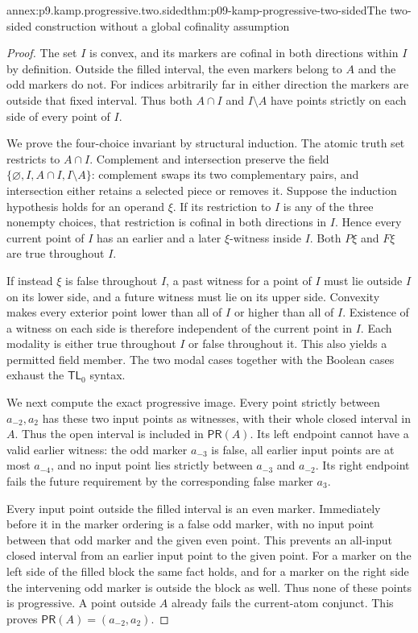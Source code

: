\begin{annexitem}{annex:p9.kamp.progressive.two.sided}{thm:p09-kamp-progressive-two-sided}{The two-sided construction without a global cofinality assumption}
\begin{proof}
The set \(I\) is convex, and its markers are cofinal
in both directions within \(I\) by definition. Outside
the filled interval, the even markers belong to \(A\)
and the odd markers do not. For indices arbitrarily
far in either direction the markers are outside that
fixed interval. Thus both \(A\cap I\) and
\(I\setminus A\) have points strictly on each side
of every point of \(I\).

We prove the four-choice invariant by structural
induction. The atomic truth set restricts to
\(A\cap I\). Complement and intersection preserve
the field \(\{\varnothing,I,A\cap I,I\setminus A\}\):
complement swaps its two complementary pairs, and
intersection either retains a selected piece or removes
it. Suppose the induction hypothesis holds for an
operand \(\xi\). If its restriction to \(I\)
is any of the three nonempty choices, that restriction
is cofinal in both directions in \(I\). Hence every
current point of \(I\) has an earlier and a later
\(\xi\)-witness inside \(I\). Both \(P\xi\)
and \(F\xi\) are true throughout \(I\).

If instead \(\xi\) is false throughout \(I\),
a past witness for a point of \(I\) must lie
outside \(I\) on its lower side, and a future
witness must lie on its upper side. Convexity makes
every exterior point lower than all of \(I\) or
higher than all of \(I\). Existence of a witness
on each side is therefore independent of the current
point in \(I\). Each modality is either true
throughout \(I\) or false throughout it. This
also yields a permitted field member. The two
modal cases together with the Boolean cases exhaust
the \(\mathsf{TL}_0\) syntax.

We next compute the exact progressive image. Every
point strictly between \(a_{-2},a_2\) has these
two input points as witnesses, with their whole
closed interval in \(A\). Thus the open interval
is included in \(\mathsf{PR}(A)\). Its left
endpoint cannot have a valid earlier witness:
the odd marker \(a_{-3}\) is false, all earlier
input points are at most \(a_{-4}\), and no
input point lies strictly between \(a_{-3}\)
and \(a_{-2}\). Its right endpoint fails the
future requirement by the corresponding false
marker \(a_3\).

Every input point outside the filled interval is
an even marker. Immediately before it in the
marker ordering is a false odd marker, with no
input point between that odd marker and the
given even point. This prevents an all-input
closed interval from an earlier input point to
the given point. For a marker on the left side
of the filled block the same fact holds, and
for a marker on the right side the intervening
odd marker is outside the block as well. Thus
none of these points is progressive. A point
outside \(A\) already fails the current-atom
conjunct. This proves
\(\mathsf{PR}(A)=(a_{-2},a_2)\).


\end{proof}
\end{annexitem}
